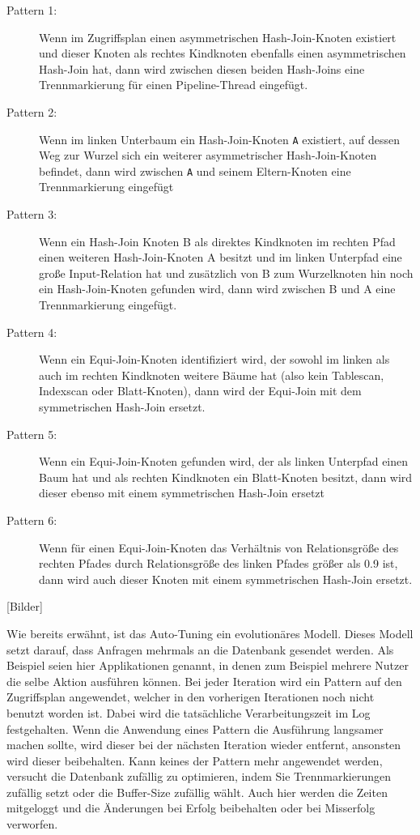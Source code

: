 \begin{description}
\item[Pattern 1:] Wenn im Zugriffsplan einen asymmetrischen Hash-Join-Knoten existiert und dieser Knoten als rechtes Kindknoten ebenfalls einen asymmetrischen Hash-Join hat, dann wird zwischen diesen beiden Hash-Joins eine Trennmarkierung für einen Pipeline-Thread eingefügt.
\item[Pattern 2:] Wenn im linken Unterbaum ein Hash-Join-Knoten \texttt{A} existiert, auf dessen Weg zur Wurzel sich ein weiterer asymmetrischer Hash-Join-Knoten befindet, dann wird zwischen \texttt{A} und seinem Eltern-Knoten eine Trennmarkierung eingefügt
\item[Pattern 3:] Wenn ein Hash-Join Knoten B als direktes Kindknoten im rechten Pfad einen weiteren Hash-Join-Knoten A besitzt und im linken Unterpfad eine große Input-Relation hat und zusätzlich von B zum Wurzelknoten hin noch ein Hash-Join-Knoten gefunden wird, dann wird zwischen B und A eine Trennmarkierung eingefügt.
\item[Pattern 4:] Wenn ein Equi-Join-Knoten identifiziert wird, der sowohl im linken als auch im rechten Kindknoten weitere Bäume hat (also kein Tablescan, Indexscan oder Blatt-Knoten), dann wird der Equi-Join mit dem symmetrischen Hash-Join ersetzt.
\item[Pattern 5:] Wenn ein Equi-Join-Knoten gefunden wird, der als linken Unterpfad einen Baum hat und als rechten Kindknoten ein Blatt-Knoten besitzt, dann wird dieser ebenso mit einem symmetrischen Hash-Join ersetzt
\item[Pattern 6:] Wenn für einen Equi-Join-Knoten das Verhältnis von Relationsgröße des rechten Pfades durch Relationsgröße des linken Pfades größer als 0.9 ist, dann wird auch dieser Knoten mit einem symmetrischen Hash-Join ersetzt.
\end{description}

[Bilder]

Wie bereits erwähnt, ist das Auto-Tuning ein evolutionäres Modell. Dieses Modell setzt darauf, dass Anfragen mehrmals an die Datenbank gesendet werden. Als Beispiel seien hier Applikationen genannt, in denen zum Beispiel mehrere Nutzer die selbe Aktion ausführen können. Bei jeder Iteration wird ein Pattern auf den Zugriffsplan angewendet, welcher in den vorherigen Iterationen noch nicht benutzt worden ist. Dabei wird die tatsächliche Verarbeitungszeit im Log festgehalten. Wenn die Anwendung eines Pattern die Ausführung langsamer machen sollte, wird dieser bei der nächsten Iteration wieder entfernt, ansonsten wird dieser beibehalten. Kann keines der Pattern mehr angewendet werden, versucht die Datenbank zufällig zu optimieren, indem Sie Trennmarkierungen zufällig setzt oder die Buffer-Size zufällig wählt. Auch hier werden die Zeiten mitgeloggt und die Änderungen bei Erfolg beibehalten oder bei Misserfolg verworfen.

